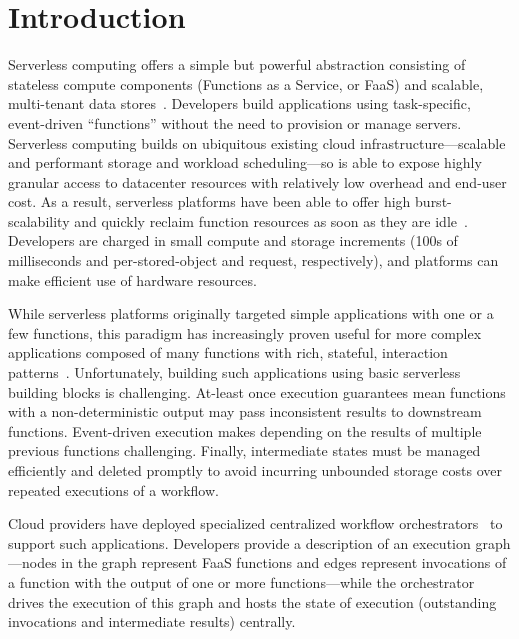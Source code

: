 \section{Introduction}\label{sec:intro}

Serverless computing offers a simple but powerful abstraction consisting of
stateless compute components (Functions as a Service, or FaaS) and scalable,
multi-tenant data stores~\cite{berkeley}. Developers build applications using
task-specific, event-driven ``functions'' without the need to provision or
manage servers.
Serverless computing builds on ubiquitous existing cloud
infrastructure---scalable and performant storage and workload scheduling---so is
able to expose highly granular access to datacenter resources with relatively
low overhead and end-user cost.
%
As a result, serverless platforms have been able to offer high burst-scalability
and quickly reclaim function resources as soon as they are
idle~\cite{aws-lambda,gcp-functions,azure-functions,openwhisk,openfaas}.
Developers are charged in small compute and storage increments (100s of
milliseconds and per-stored-object and request, respectively), and platforms can
make efficient use of hardware resources.

While serverless platforms originally targeted simple applications with one or a
few functions, this paradigm has increasingly proven useful for more complex
applications composed of many functions with rich, stateful, interaction
patterns~\cite{excamera, pywren, gg-atc, beldi, boki}. Unfortunately, building
such applications using basic serverless building blocks is challenging.
At-least once execution guarantees mean functions with a non-deterministic output may
pass inconsistent results to downstream functions. Event-driven execution makes
depending on the results of multiple previous functions challenging. Finally,
intermediate states must be managed efficiently and deleted promptly to avoid
incurring unbounded storage costs over repeated executions of a workflow.

Cloud providers have deployed specialized centralized workflow
orchestrators~\cite{aws-step-functions, google-cloud-composer, google-workflows,
durable-functions} to support such applications. Developers provide a
description of an execution graph---nodes in the graph represent FaaS functions
and edges represent invocations of a function with the output of one or more
functions---while the orchestrator drives the execution of this graph and hosts
the state of execution (outstanding invocations and intermediate results)
centrally.

